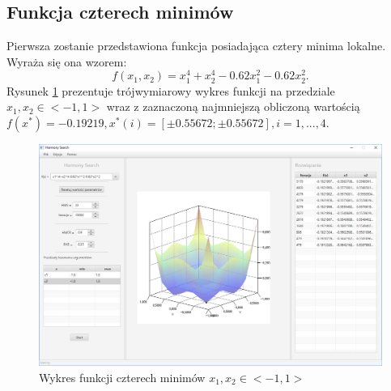 \documentclass[10pt, a4paper]{article}
\begin{document}
\subsection{Funkcja czterech minimów}
\label{subsec:fcn4min}
Pierwsza zostanie przedstawiona funkcja posiadająca cztery minima lokalne. Wyraża się ona wzorem: $$f(x_{1},x_{2}) = x_{1}^{4}+x_{2}^{4}-0.62x_{1}^{2}-0.62x_{2}^{2}. $$  Rysunek \ref{fig:11} prezentuje trójwymiarowy wykres funkcji na przedziale $x_{1}, x_{2} \in <-1,1>$ wraz z zaznaczoną najmniejszą obliczoną wartością $f(x^*)=-0.19219, x^{*}(i) = [ \pm0.55672; \pm 0.55672], i = 1,...,4 $. 
\begin{figure}[htbp]
	\centering
		\includegraphics[width=.9\textwidth]{images/11.PNG}
		\caption{Wykres funkcji czterech minimów $x_{1}, x_{2} \in <-1,1>$}
		\label{fig:11}
\end{figure}
\end{document}
